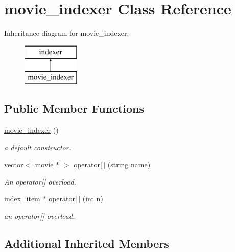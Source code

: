 \hypertarget{classmovie__indexer}{}\section{movie\+\_\+indexer Class Reference}
\label{classmovie__indexer}
Inheritance diagram for movie\+\_\+indexer\+:\begin{figure}[H]
\begin{center}
\leavevmode
\includegraphics[height=2.000000cm]{classmovie__indexer}
\end{center}
\end{figure}
\subsection*{Public Member Functions}
\begin{DoxyCompactItemize}
\item 
\hyperlink{classmovie__indexer_a24fcbe6f81f28e9007202cd96df5e191}{movie\+\_\+indexer} ()
\begin{DoxyCompactList}\small\item\em a default constructor. \end{DoxyCompactList}\item 
vector$<$ \hyperlink{classmovie}{movie} $\ast$ $>$ \hyperlink{classmovie__indexer_a5b7aa1d935689ad1afbcfe2c877d3ae9}{operator\mbox{[}$\,$\mbox{]}} (string name)
\begin{DoxyCompactList}\small\item\em An operator\mbox{[}\mbox{]} overload. \end{DoxyCompactList}\item 
\hyperlink{classindex__item}{index\+\_\+item} $\ast$ \hyperlink{classmovie__indexer_aeaadd1ac660403a0f55122c6afea3acc}{operator\mbox{[}$\,$\mbox{]}} (int n)
\begin{DoxyCompactList}\small\item\em an operator\mbox{[}\mbox{]} overload. \end{DoxyCompactList}\end{DoxyCompactItemize}
\subsection*{Additional Inherited Members}


